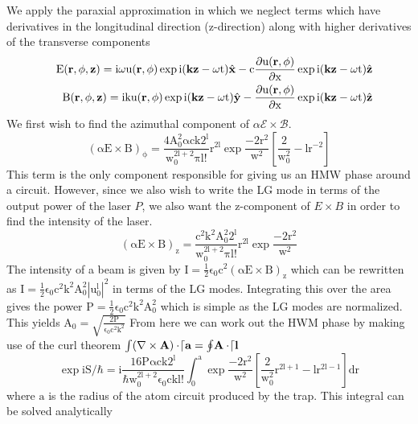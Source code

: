 We apply the paraxial approximation in which we neglect terms which have derivatives in the longitudinal direction (z-direction) along with higher derivatives of the transverse components
\begin{eqnarray}
&&\mathrm{E(\bold{r,\phi,z})= i\omega u(\bold{r,\phi})\exp{i(\bold{kz}-\omega t)}\hat{\bold{x}} -c \frac{\partial u(\bold{r,\phi})}{\partial x}\exp{i(\bold{kz}-\omega t)}\hat{\bold{z}}} \nonumber \\
&&\mathrm{B(\bold{r,\phi,z})=ik u(\bold{r,\phi})\exp{i(\bold{kz}-\omega t)}\hat{\bold{y}}-\frac{\partial u(\bold{r,\phi})}{\partial x}\exp{i(\bold{kz}-\omega t)}\hat{\bold{z}}} \nonumber \\
\end{eqnarray}
We first wish to find the azimuthal component of $\mathcal{\alpha E\times B}$.  
\begin{equation}
\mathrm{\left(\alpha E\times B\right)_{\phi}=\frac{4A_0^2 \alpha ck 2^l}{w_0^{2l+2} \pi l!}r^{2l}\exp{\frac{-2r^2}{w^2}}\left[\frac{2}{w_0^2}-lr^{-2}\right]}
\end{equation}
This term is the only component responsible for giving us an HMW phase around a circuit.  However, since we also wish to write the LG mode in terms of the output power of the laser $P$, we also want the z-component of $E\times B$ in order to find the intensity of the laser.  
\begin{equation}
\mathrm{\left(\alpha E\times B\right)_{z}=\frac{c^2 k^2 A_0^2 2^l}{w_0^{2l+2} \pi l!}r^{2l}\exp{\frac{-2r^2}{w^2}}}
\end{equation}
The intensity of a beam is given by $\mathrm{I=\frac{1}{2}\epsilon_0 c^2 \left(\alpha E\times B\right)_{z}}$ which can be rewritten as $\mathrm{I=\frac{1}{2}\epsilon_0 c^2 k^2 A_0^2 |u_0^l|^2}$ in terms of the LG modes.  Integrating this over the area gives the power $\mathrm{P=\frac{1}{2}\epsilon_0 c^2 k^2 A_0^2}$ which is simple as the LG modes are normalized.  This yields $\mathrm{A_0=\sqrt{\frac{2P}{\epsilon_0 c^2 k^2}}}$
From here we can work out the HWM phase by making use of the curl theorem $\mathcal{\int\!\left(\nabla \times \bold{A}\right)\cdot\! d\bold{a}=\oint \!\bold{A}\cdot \!d\bold{l}}$ 
\label{HMW}
\begin{equation}
\mathrm{\exp{iS/\hbar}=i\frac{16P \alpha ck 2^l}{\hbar w_0^{2l+2} \epsilon_0 ck l!}\int_0^a\!\exp{\frac{-2r^2}{w^2}}\left[ \frac{2}{w_0^2}r^{2l+1}-lr^{2l-1}\right]\!dr}
\end{equation}
where $\mathrm{a}$ is the radius of the atom circuit produced by the trap.  This integral can be solved analytically 
